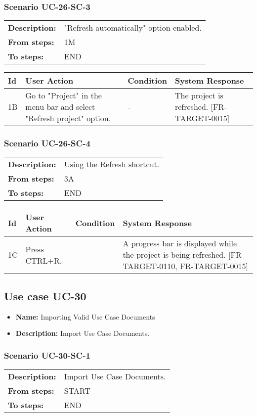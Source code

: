 \documentclass[a4paper,11pt]{article}
\newcommand{\bl}{\\ \hline}
\begin{document}
\subsubsection*{Scenario UC-26-SC-3}
\begin{tabular}{p{1in}p{4in}}
{\bf Description:} & "Refresh automatically" option enabled. \\
{\bf From steps:} & 1M \\
{\bf To steps:} & END \\
\end{tabular}
 
\begin{tabular}{|p{0.8in}|p{1.6in}|p{1.6in}|p{1.6in}|}
\hline
Id & User Action & Condition & System Response  \bl 
1B & Go to "Project" in the menu bar and select "Refresh project" option. & - & The project is refreshed. [FR-TARGET-0015] \bl 
\end{tabular}
\subsubsection*{Scenario UC-26-SC-4}
\begin{tabular}{p{1in}p{4in}}
{\bf Description:} & Using the Refresh shortcut. \\
{\bf From steps:} & 3A \\
{\bf To steps:} & END \\
\end{tabular}
 
\begin{tabular}{|p{0.8in}|p{1.6in}|p{1.6in}|p{1.6in}|}
\hline
Id & User Action & Condition & System Response  \bl 
1C & Press CTRL+R. & - & A progress bar is displayed while the project is being refreshed. [FR-TARGET-0110, FR-TARGET-0015] \bl 
\end{tabular}
\subsection*{Use case UC-30}
\begin{itemize}
\item {\bf Name: }Importing Valid Use Case Documents
\item {\bf Description: }Import Use Case Documents.
\end{itemize}
\subsubsection*{Scenario UC-30-SC-1}
\begin{tabular}{p{1in}p{4in}}
{\bf Description:} & Import Use Case Documents. \\
{\bf From steps:} & START \\
{\bf To steps:} & END \\
\end{tabular}
 
\end{document}
